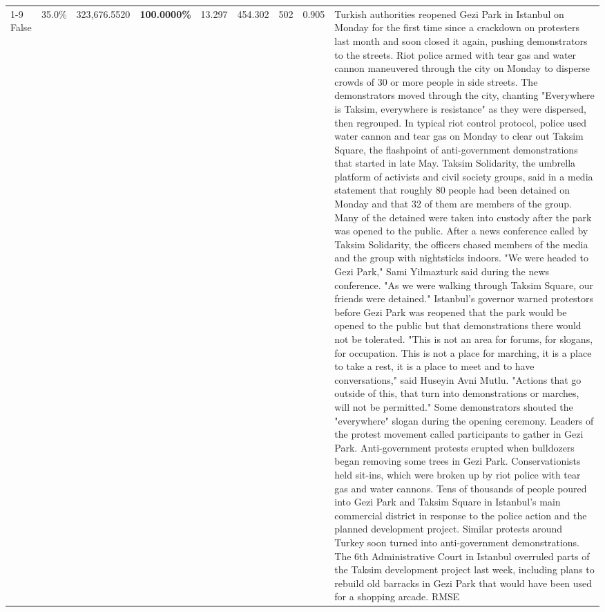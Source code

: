 \begin{table}[H]
\begin{tabular}{lllrlllll}
\cline{1-9}
False & 35.0\% & 323,676.5520 & \bfseries \color{red} 100.0000\% & 13.297 & 454.302 & 502 & 0.905 & Turkish authorities reopened Gezi Park in Istanbul on Monday for the first time since a crackdown on protesters last month and soon closed it again, pushing demonstrators to the streets. Riot police armed with tear gas and water cannon maneuvered through the city on Monday to disperse crowds of 30 or more people in side streets. The demonstrators moved through the city, chanting "Everywhere is Taksim, everywhere is resistance" as they were dispersed, then regrouped. In typical riot control protocol, police used water cannon and tear gas on Monday to clear out Taksim Square, the flashpoint of anti-government demonstrations that started in late May. Taksim Solidarity, the umbrella platform of activists and civil society groups, said in a media statement that roughly 80 people had been detained on Monday and that 32 of them are members of the group. Many of the detained were taken into custody after the park was opened to the public. After a news conference called by Taksim Solidarity, the officers chased members of the media and the group with nightsticks indoors. "We were headed to Gezi Park," Sami Yilmazturk said during the news conference. "As we were walking through Taksim Square, our friends were detained." Istanbul's governor warned protestors before Gezi Park was reopened that the park would be opened to the public but that demonstrations there would not be tolerated. "This is not an area for forums, for slogans, for occupation. This is not a place for marching, it is a place to take a rest, it is a place to meet and to have conversations," said Huseyin Avni Mutlu. "Actions that go outside of this, that turn into demonstrations or marches, will not be permitted." Some demonstrators shouted the "everywhere" slogan during the opening ceremony. Leaders of the protest movement called participants to gather in Gezi Park. Anti-government protests erupted when bulldozers began removing some trees in Gezi Park. Conservationists held sit-ins, which were broken up by riot police with tear gas and water cannons. Tens of thousands of people poured into Gezi Park and Taksim Square in Istanbul's main commercial district in response to the police action and the planned development project. Similar protests around Turkey soon turned into anti-government demonstrations. The 6th Administrative Court in Istanbul overruled parts of the Taksim development project last week, including plans to rebuild old barracks in Gezi Park that would have been used for a shopping arcade. RMSE \\

\end{tabular}
\end{table}
